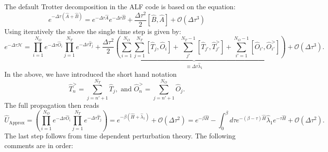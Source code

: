 The default   Trotter decomposition in the ALF code is  based on the equation: 
\begin{equation}
	e^{ -\Delta \tau \left( \hat{A} + \hat{B} \right)  }  =  e^{ -\Delta \tau \hat{A}}  e^{ -\Delta \tau  \hat{B}  }   +  \frac{\Delta  \tau^2}{2} \left[ \hat{B}, \hat{A} \right] + \mathcal{O} \left (\Delta \tau ^3 \right) 
\end{equation}
Using   iteratively the above  the single time step is given by: 
\begin{equation}
    e^{-\Delta \tau \mathcal{H}}    =   \prod_{i=1}^{N_O} e^{-\Delta \tau \hat{O}_i} \prod_{j=1}^{N_T} e^{-\Delta \tau \hat{T}_j}  +  \underbrace{ \frac{\Delta \tau^2}{2}  
   \left(    \sum_{i=1}^{N_O}  \sum_{j=1}^{N_T} \left[ \hat{T}_j, \hat{O}_i \right]  +   \sum_{j'}^{N_T -1}  \left[ \hat{T}_{j'},   \hat{T}_{j'}^{>}\right] 
   +   \sum_{i'=1}^{N_O-1}  \left[ \hat{O}_{i'}, \hat{O}^{>}_{i'} \right]  \right)  }_{\equiv \Delta \tau \hat{\lambda}_1}   
   + \mathcal{O} \left( \Delta \tau^3 \right).
\end{equation}
In the above, we have introduced the short hand notation 
\begin{equation}
\hat{T}_{n}^{>} = \sum_{j=n'+1}^{N_T}  \hat{T}_{j}, \, \, \text{and} \, \, \hat{O}_{n}^{>} = \sum_{j=n'+1}^{N_O}  \hat{O}_{j}.
\end{equation} 
The full propagation   then reads
\begin{equation}
  \hat{U}_{\text{Approx}} =  \left(\prod_{i=1}^{N_O} e^{-\Delta \tau \hat{O}_i} \prod_{j=1}^{N_T} e^{-\Delta \tau \hat{T}_j}  \right)   = e^{-\beta \left(  \hat{H} + \hat{\lambda}_1 \right)} 
  + \mathcal{O} \left( \Delta \tau^2 \right)
  =  e^{-\beta  \hat{H}  }  - 
	 \int_0^{\beta}  d \tau  e^{-(\beta-\tau )\hat{H}} \hat{\lambda}_1  e^{-\tau \hat{H}}   +  \mathcal{O} (\Delta \tau^2 ).
\end{equation}
The last step follows from time dependent perturbation theory. 
The following comments are in order:
